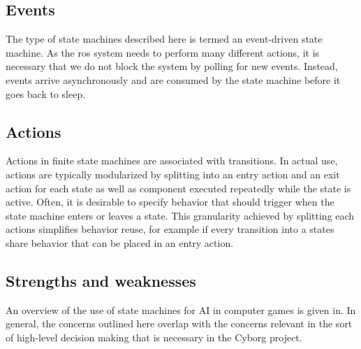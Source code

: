 \documentclass[\rootfolder/main.tex]{subfiles}
\begin{document}

\subsection{Events}

The type of state machines described here is termed an event-driven state machine.
As the \acrshort{ros} system needs to perform many different actions, it is necessary that we do not block the system by polling for new events.
Instead, events arrive asynchronously and are consumed by the state machine before it goes back to sleep.


\subsection{Actions}

Actions in finite state machines are associated with transitions.
In actual use, actions are typically modularized by splitting into an entry action and an exit action for each state as well as component executed repeatedly while the state is active.
Often, it is desirable to specify behavior that should trigger when the state machine enters or leaves a state.
This granularity achieved by splitting each actions simplifies behavior reuse, for example if every transition into a states share behavior that can be placed in an entry action.


\subsection{Strengths and weaknesses}
\label{sec:state_machine_strength_weaknesses}

An overview of the use of state machines for AI in computer games is given in.
In general, the concerns outlined here overlap with the concerns relevant in the sort of high-level decision making that is necessary in the Cyborg project.
\end{document}
